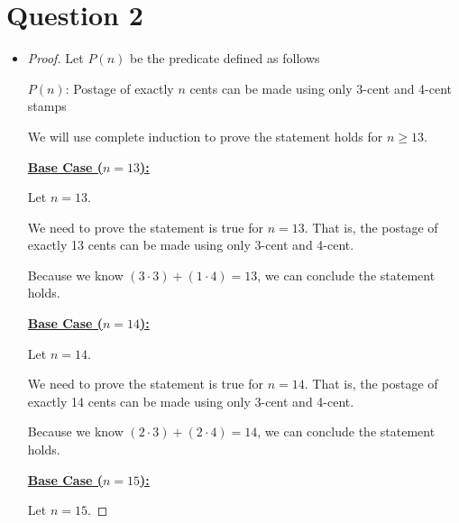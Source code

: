 \documentclass[12pt]{article}
\begin{document}
\section*{Question 2}
\begin{itemize}
    \item

    \begin{proof}
    Let $P(n)$ be the predicate defined as follows

    \bigskip

    \begin{center}
        $P(n)$: Postage of exactly $n$ cents can be made using only 3-cent and 4-cent stamps
    \end{center}

    \bigskip

    We will use complete induction to prove the statement holds for $n \geq 13$.

    \bigskip

    \underline{\textbf{Base Case ($n = 13$):}}

    \bigskip

    Let $n = 13$.

    \bigskip

    We need to prove the statement is true for $n = 13$. That is, the
    postage of exactly 13 cents can be made using only 3-cent and 4-cent.

    \bigskip

    Because we know $(3 \cdot 3) + (1 \cdot 4)=13$, we can conclude the statement holds.

    \bigskip

    \underline{\textbf{Base Case ($n = 14$):}}

    \bigskip

    Let $n = 14$.

    \bigskip

    We need to prove the statement is true for $n = 14$. That is, the
    postage of exactly 14 cents can be made using only 3-cent and 4-cent.

    \bigskip

    Because we know $(2 \cdot 3) + (2 \cdot 4)=14$, we can conclude the statement holds.

    \bigskip

    \underline{\textbf{Base Case ($n = 15$):}}

    \bigskip

    Let $n = 15$.

    \bigskip


\end{proof}
\end{itemize}
\end{document}
